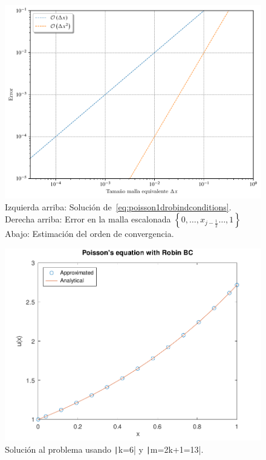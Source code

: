 \begin{problem}
\begin{figure}[ht!]
    \includegraphics[width=.6\paperwidth]{elliptic1Dconvergenceorder.pdf}
    \caption{Izquierda arriba: Solución de~\eqref{eq:poisson1drobindconditions}.
        Derecha arriba: Error en la malla escalonada
        \begin{math}
            \left\{
            0,
            \dotsc,
            x_{j-\frac{1}{2}}
            \dotsc,
            1
            \right\}
        \end{math}
        Abajo: Estimación del orden de convergencia.}
\end{figure}

\begin{figure}[ht!]
    \centering
    \includegraphics[width=.6\paperwidth]{../examples/octave/elliptic1D.pdf}
    \caption{Solución al problema usando \texttt|k=6| y \texttt|m=2k+1=13|.}
\end{figure}


\end{problem}
